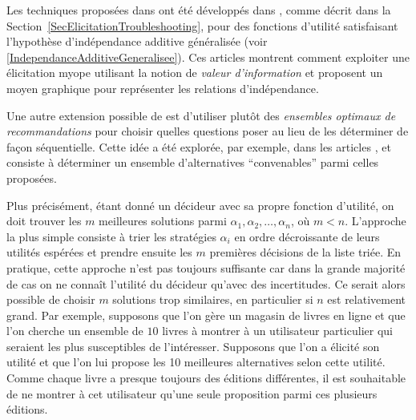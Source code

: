 \documentclass[a4paper,11pt]{article}
\theoremstyle{plain}
\theoremstyle{definition}
\begin{document}
Les techniques proposées dans \cite{chajewska_making_2000, boutilier_pomdp_2002} ont été développés dans \cite{braziunas_local_2005, Braziunas_2008}, comme décrit dans la Section~\ref{SecElicitationTroubleshooting}, pour des fonctions d'utilité satisfaisant l'hypothèse d'indépendance additive généralisée (voir \eqref{IndependanceAdditiveGeneralisee}). Ces articles montrent comment exploiter une élicitation myope utilisant la notion de \emph{valeur d'information} et proposent un moyen graphique pour représenter les relations d'indépendance.

Une autre extension possible de \cite{chajewska_making_2000, boutilier_pomdp_2002} est d'utiliser plutôt des \emph{ensembles optimaux de recommandations} pour choisir quelles questions poser au lieu de les déterminer de façon séquentielle. Cette idée a été explorée, par exemple, dans les articles \cite{price_optimal_2005, viappiani_optimal_2005}, et consiste à déterminer un ensemble d'alternatives ``convenables'' parmi celles proposées.

Plus précisément, étant donné un décideur avec sa propre fonction d'utilité, on doit trouver les $m$ meilleures solutions parmi $\alpha_1, \alpha_2, \dotsc, \alpha_n$, où $m < n$. L'approche la plus simple consiste à trier les stratégies $\alpha_i$ en ordre décroissante de leurs utilités espérées et prendre ensuite les $m$ premières décisions de la liste triée. En pratique, cette approche n'est pas toujours suffisante \cite{price_optimal_2005} car dans la grande majorité de cas on ne connaît l'utilité du décideur qu'avec des incertitudes. Ce serait alors possible de choisir $m$ solutions trop similaires, en particulier si $n$ est relativement grand. Par exemple, supposons que l'on gère un magasin de livres en ligne et que l'on cherche un ensemble de $10$ livres à montrer à un utilisateur particulier qui seraient les plus susceptibles de l'intéresser. Supposons que l'on a élicité son utilité et que l'on lui propose les 10 meilleures alternatives selon cette utilité. Comme chaque livre a presque toujours des éditions différentes, il est souhaitable de ne montrer à cet utilisateur qu'une seule proposition parmi ces plusieurs éditions.
\end{document}
